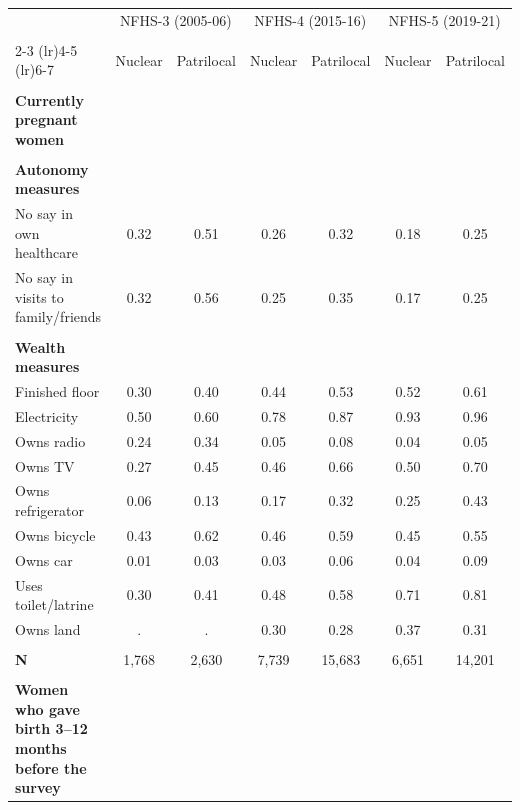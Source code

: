 \begin{tabular}{lcccccc}
\toprule
 & \multicolumn{2}{c}{NFHS-3 (2005-06)} & \multicolumn{2}{c}{NFHS-4 (2015-16)} & \multicolumn{2}{c}{NFHS-5 (2019-21)} \\\\
\cmidrule(lr){2-3} \cmidrule(lr){4-5} \cmidrule(lr){6-7}
 & Nuclear & Patrilocal & Nuclear & Patrilocal & Nuclear & Patrilocal \\\\
\midrule
\textbf{Currently pregnant women}&&&&&&\\
&&&&&&\\
\textbf{Autonomy measures}&&&&&&\\
\hspace*{2em}No say in own healthcare&0.32&0.51&0.26&0.32&0.18&0.25\\
\hspace*{2em}No say in visits to family/friends&0.32&0.56&0.25&0.35&0.17&0.25\\
&&&&&&\\
\textbf{Wealth measures}&&&&&&\\
\hspace*{2em}Finished floor&0.30&0.40&0.44&0.53&0.52&0.61\\
\hspace*{2em}Electricity&0.50&0.60&0.78&0.87&0.93&0.96\\
\hspace*{2em}Owns radio&0.24&0.34&0.05&0.08&0.04&0.05\\
\hspace*{2em}Owns TV&0.27&0.45&0.46&0.66&0.50&0.70\\
\hspace*{2em}Owns refrigerator&0.06&0.13&0.17&0.32&0.25&0.43\\
\hspace*{2em}Owns bicycle&0.43&0.62&0.46&0.59&0.45&0.55\\
\hspace*{2em}Owns car&0.01&0.03&0.03&0.06&0.04&0.09\\
\hspace*{2em}Uses toilet/latrine&0.30&0.41&0.48&0.58&0.71&0.81\\
\hspace*{2em}Owns land&.&.&0.30&0.28&0.37&0.31\\
&&&&&&\\
\textbf{N}&1,768&2,630&7,739&15,683&6,651&14,201\\
&&&&&&\\
\textbf{Women who gave birth 3--12 months before the survey}&&&&&&\\

\end{tabular}
